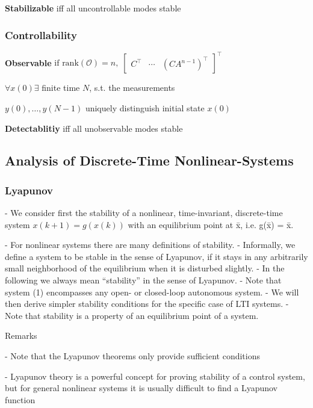 \textbf{Stabilizable} iff all uncontrollable modes stable

\subsubsection{Controllability}
\textbf{Observable}
$
	\text{if rank}(\mathcal{O}) = n
	,\;
	\begin{bmatrix}
		C^\top & \cdots & (CA^{n-1})^\top
	\end{bmatrix}^\top
$

$\forall x(0)\exists$ finite time $N$, s.t. the measurements

$y(0), \dots, y(N-1)$
uniquely distinguish initial state $x(0)$

\textbf{Detectablitiy} iff all unobservable modes stable


\subsection{Analysis of Discrete-Time Nonlinear-Systems}

\subsubsection{Lyapunov}

- We consider first the stability of a nonlinear,
time-invariant, discrete-time system
$x(k +1) = g(x(k))$
with an equilibrium point at x̄, i.e. g(x̄) = x̄.

- For nonlinear systems there are many definitions of stability.
- Informally, we define a system to be stable in the sense of Lyapunov, if it
stays in any arbitrarily small neighborhood of the equilibrium when it is
disturbed slightly.
- In the following we always mean “stability” in the sense of Lyapunov.
- Note that system (1) encompasses any open- or closed-loop autonomous
system.
- We will then derive simpler stability conditions for the specific case of LTI
systems.
- Note that stability is a property of an equilibrium point of a system.


Remarks

-  Note that the Lyapunov theorems only provide sufficient conditions

-  Lyapunov theory is a powerful concept for proving stability of a control
system, but for general nonlinear systems it is usually difficult to find a
Lyapunov function

